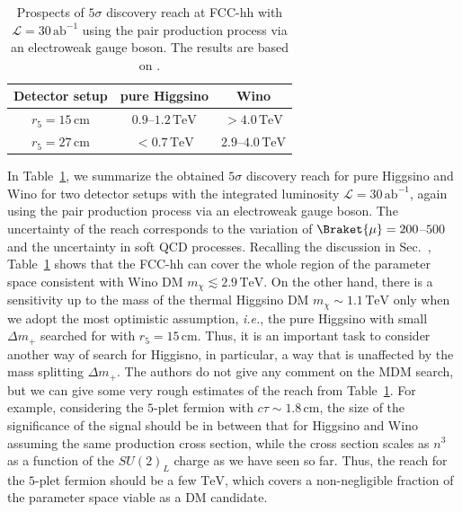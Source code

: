 \documentclass[12pt,twoside,book]{article}
\begin{document}
\begin{table}[t]
  \centering
  \begin{tabular}{c|cc}
    Detector setup & pure Higgsino & Wino \\ \hline
    $r_5 = 15\,\mathrm{cm}$ & $0.9$--$1.2\,\mathrm{TeV}$ & $> 4.0\,\mathrm{TeV}$ \\
    $r_5 = 27\,\mathrm{cm}$ & $<0.7\,\mathrm{TeV}$ & $2.9$--$4.0\,\mathrm{TeV}$
  \end{tabular}
  \caption{
    Prospects of $5\sigma$ discovery reach at FCC-hh with $\mathcal{L} = 30\,\mathrm{ab}^{-1}$  using the pair production process via an electroweak gauge boson.
    The results are based on \cite{Saito:2019rtg}.
  }
  \label{tab:disp_track_future}
\end{table}

In Table~\ref{tab:disp_track_future}, we summarize the obtained $5\sigma$ discovery reach for pure Higgsino and Wino for two detector setups with the integrated luminosity $\mathcal{L} = 30\,\mathrm{ab}^{-1}$, again using the pair production process via an electroweak gauge boson.
The uncertainty of the reach corresponds to the variation of $\Braket{\mu}=200$--$500$ and the uncertainty in soft QCD processes.
Recalling the discussion in Sec.~, Table~\ref{tab:disp_track_future} shows that the FCC-hh can cover the whole region of the parameter space consistent with Wino DM $m_\chi \lesssim 2.9\,\mathrm{TeV}$.
On the other hand, there is a sensitivity up to the mass of the thermal Higgsino DM $m_\chi \sim 1.1\,\mathrm{TeV}$ only when we adopt the most optimistic assumption, \textit{i.e.}, the pure Higgsino with small $\Delta m_{+}$ searched for with $r_5 = 15\,\mathrm{cm}$.
Thus, it is an important task to consider another way of search for Higgisno, in particular, a way that is unaffected by the mass splitting $\Delta m_{+}$.
The authors do not give any comment on the MDM search, but we can give some very rough estimates of the reach from Table~\ref{tab:disp_track_future}.
For example, considering the $5$-plet fermion with $c\tau \sim 1.8\,\mathrm{cm}$, the size of the significance of the signal should be in between that for Higgsino and Wino assuming the same production cross section, while the cross section scales as $n^3$ as a function of the $SU(2)_L$ charge as we have seen so far.
Thus, the reach for the $5$-plet fermion should be a few $\mathrm{TeV}$, which covers a non-negligible fraction of the parameter space viable as a DM candidate.


\end{document}
